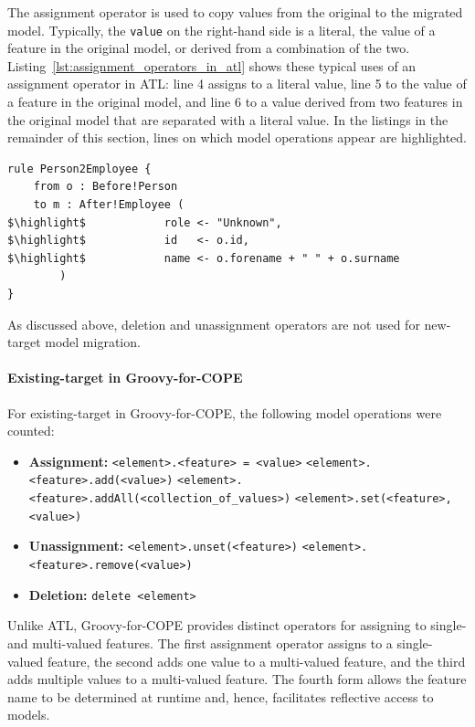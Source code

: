 The assignment operator is used to copy values from the original to the migrated model. Typically, the \texttt{value} on the right-hand side is a literal, the value of a feature in the original model, or derived from a combination of the two. Listing~\ref{lst:assignment_operators_in_atl} shows these typical uses of an assignment operator in ATL: line 4 assigns to a literal value, line 5 to the value of a feature in the original model, and line 6 to a value derived from two features in the original model that are separated with a literal value. In the listings in the remainder of this section, lines on which model operations appear are highlighted.

\begin{lstlisting}[caption=Assignment operators in ATL, label=lst:assignment_operators_in_atl, language=ATL]
rule Person2Employee {
	from o : Before!Person
	to m : After!Employee (
$\highlight$			role <- "Unknown",
$\highlight$			id   <- o.id,
$\highlight$			name <- o.forename + " " + o.surname
		)
}
\end{lstlisting}

As discussed above, deletion and unassignment operators are not used for new-target model migration.


\paragraph{Existing-target in Groovy-for-COPE}
For existing-target in Groovy-for-COPE, the following model operations were counted:

\begin{itemize}
	\item \textbf{Assignment:}
	\subitem \texttt{<element>.<feature> = <value>}
	\subitem \texttt{<element>.<feature>.add(<value>)}
	\subitem \texttt{<element>.<feature>.addAll(<collection\_of\_values>)}
	\subitem \texttt{<element>.set(<feature>, <value>)}
	
	\item \textbf{Unassignment:}
	\subitem \texttt{<element>.unset(<feature>)}
	\subitem \texttt{<element>.<feature>.remove(<value>)}
	
	\item \textbf{Deletion:}
	\subitem \texttt{delete <element>}
\end{itemize}

Unlike ATL, Groovy-for-COPE provides distinct operators for assigning to single- and multi-valued features. The first assignment operator assigns to a single-valued feature, the second adds one value to a multi-valued feature, and the third adds multiple values to a multi-valued feature. The fourth form allows the feature name to be determined at runtime and, hence, facilitates reflective access to models. 

